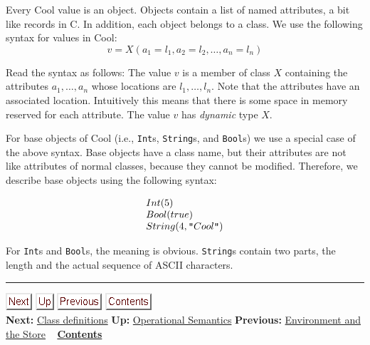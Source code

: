 \documentclass[]{article}
\begin{document}
Every Cool value is an object. Objects contain a list of named
attributes, a bit like records in C. In addition, each object belongs to
a class. We use the following syntax for values in Cool: \\

\begin{displaymath}
v = X(a_1=l_1,a_2=l_2,\ldots,a_n=l_n)
\end{displaymath}

Read the syntax as follows: The value $ v$ is a member of class $X$
containing the attributes $a_1, \ldots, a_n$ whose locations are
$l_1, \ldots, l_n$. Note that the attributes have an associated
location. Intuitively this means that there is some space in memory
reserved for each attribute. The value $ v$ has \emph{dynamic} type $X$.

For base objects of Cool (i.e., \texttt{Int}s, \texttt{String}s, and
\texttt{Bool}s) we use a special case of the above syntax. Base objects
have a class name, but their attributes are not like attributes of
normal classes, because they cannot be modified. Therefore, we describe
base objects using the following syntax:

\begin{displaymath}
\begin{array}{l}
Int(5)\\
Bool(true)\\
String(4,\mbox {\tt ''}Cool \mbox {\tt ''})
\end{array}\end{displaymath}

For \texttt{Int}s and \texttt{Bool}s, the meaning is obvious.
\texttt{String}s contain two parts, the length and the actual sequence
of ASCII characters.

\begin{center}\rule{3in}{0.4pt}\end{center}

\href{node47.html}{\includegraphics{next.png}}
\href{node44.html}{\includegraphics{up.png}}
\href{node45.html}{\includegraphics{prev.png}}
\href{node1.html}{\includegraphics{contents.png}} \\ \textbf{Next:}
\href{node47.html}{Class definitions} \textbf{Up:}
\href{node44.html}{Operational Semantics} \textbf{Previous:}
\href{node45.html}{Environment and the Store} ~
\textbf{\href{node1.html}{Contents}}
\end{document}
